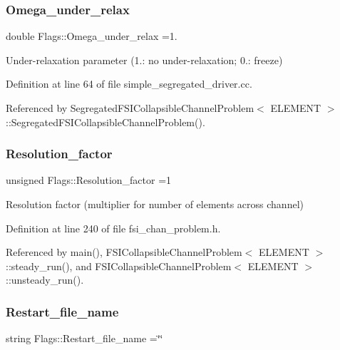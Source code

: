 \subsubsection{\texorpdfstring{Omega\+\_\+under\+\_\+relax}{Omega\_under\_relax}}
{\footnotesize\ttfamily double Flags\+::\+Omega\+\_\+under\+\_\+relax =1.}



Under-\/relaxation parameter (1.\+: no under-\/relaxation; 0.\+: freeze) 



Definition at line 64 of file simple\+\_\+segregated\+\_\+driver.\+cc.



Referenced by Segregated\+F\+S\+I\+Collapsible\+Channel\+Problem$<$ E\+L\+E\+M\+E\+N\+T $>$\+::\+Segregated\+F\+S\+I\+Collapsible\+Channel\+Problem().

\mbox{\label{namespaceFlags_a7c2437aa0b6a4f27df951f1cbcef7337}} 
\subsubsection{\texorpdfstring{Resolution\+\_\+factor}{Resolution\_factor}}
{\footnotesize\ttfamily unsigned Flags\+::\+Resolution\+\_\+factor =1}



Resolution factor (multiplier for number of elements across channel) 



Definition at line 240 of file fsi\+\_\+chan\+\_\+problem.\+h.



Referenced by main(), F\+S\+I\+Collapsible\+Channel\+Problem$<$ E\+L\+E\+M\+E\+N\+T $>$\+::steady\+\_\+run(), and F\+S\+I\+Collapsible\+Channel\+Problem$<$ E\+L\+E\+M\+E\+N\+T $>$\+::unsteady\+\_\+run().

\mbox{\label{namespaceFlags_a3657ad4e287c8756f096b2abe1277cf3}} 
\subsubsection{\texorpdfstring{Restart\+\_\+file\+\_\+name}{Restart\_file\_name}}
{\footnotesize\ttfamily string Flags\+::\+Restart\+\_\+file\+\_\+name =\char`\"{}\char`\"{}}




